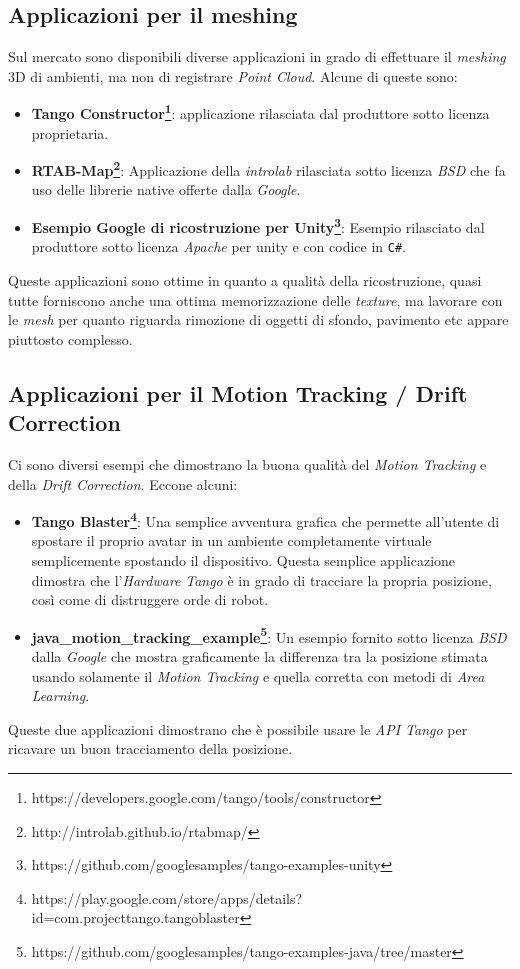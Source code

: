 \subsection{Applicazioni per il meshing}
Sul mercato sono disponibili diverse applicazioni in grado di effettuare il \emph{meshing} 3D di ambienti, ma non di registrare \emph{Point Cloud}. Alcune di queste sono:
\begin{itemize}
	\item \textbf{Tango Constructor\footnote{https://developers.google.com/tango/tools/constructor}}: applicazione rilasciata dal produttore sotto licenza proprietaria.
	\item \textbf{RTAB-Map\footnote{http://introlab.github.io/rtabmap/}}: Applicazione della \emph{introlab} rilasciata sotto licenza \emph{BSD} che fa uso delle librerie native offerte dalla \emph{Google}.
	\item \textbf{Esempio Google di ricostruzione per Unity\footnote{https://github.com/googlesamples/tango-examples-unity}}: Esempio rilasciato dal produttore sotto licenza \emph{Apache} per unity e con codice in \texttt{C\#}.
\end{itemize}
Queste applicazioni sono ottime in quanto a qualità della ricostruzione, quasi tutte forniscono anche una ottima memorizzazione delle \emph{texture}, ma lavorare con le \emph{mesh} per quanto riguarda rimozione di oggetti di sfondo, pavimento etc appare piuttosto complesso.

\subsection{Applicazioni per il Motion Tracking / Drift Correction}
Ci sono diversi esempi che dimostrano la buona qualità del \emph{Motion Tracking} e della \emph{Drift Correction}.
Eccone alcuni:
\begin{itemize}
	\item \textbf{Tango Blaster\footnote{https://play.google.com/store/apps/details?id=com.projecttango.tangoblaster}}: Una semplice avventura grafica che permette all'utente di spostare il proprio avatar in un ambiente completamente virtuale semplicemente spostando il dispositivo. Questa semplice applicazione dimostra che l'\emph{Hardware} \emph{Tango} è in grado di tracciare la propria posizione, così come di distruggere orde di robot.
	\item \textbf{java\_motion\_tracking\_example\footnote{https://github.com/googlesamples/tango-examples-java/tree/master}}: Un esempio fornito sotto licenza \emph{BSD} dalla \emph{Google} che mostra graficamente la differenza tra la posizione stimata usando solamente il \emph{Motion Tracking} e quella corretta con metodi di \emph{Area Learning}.
\end{itemize}
Queste due applicazioni dimostrano che è possibile usare le \emph{API Tango} per ricavare un buon tracciamento della posizione.

